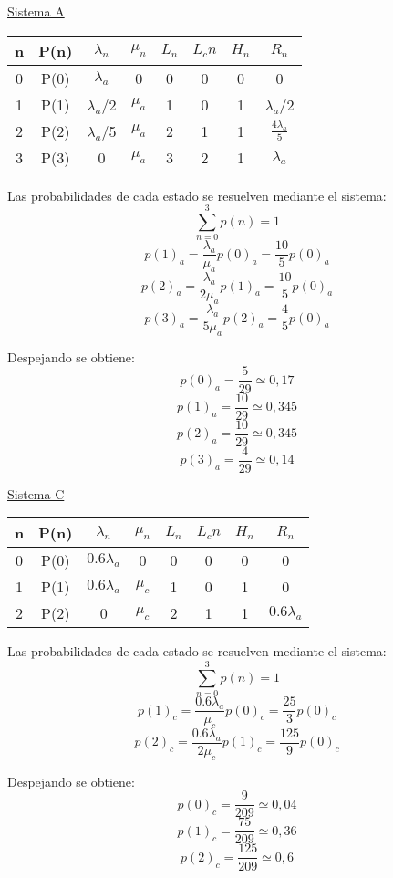 \documentclass{article}
\begin{document}
 \begin{center}
  \underline{Sistema A} \\ 
    \begin{tabular}{|| c | c | c | c | c | c | c | c ||}
    \hline 
     n & P(n) & $\lambda_n$ & $\mu_n$ & $L_n$& $L_cn$ & $H_n$ & $R_n$ 			\\ \hline \hline
     0 & P(0) & $\lambda_a$   & 0       & 0    & 0      & 0     & 0			\\ \hline
     1 & P(1) & $\lambda_a$/2 & $\mu_a$ & 1    & 0      & 1     & $\lambda_a$/2		\\ \hline
     2 & P(2) & $\lambda_a$/5 & $\mu_a$ & 2    & 1      & 1     & $\frac{4\lambda_a}{5}$	\\ \hline
     3 & P(3) &  0            & $\mu_a$ & 3    & 2      & 1     & $\lambda_a$ 		\\ \hline
     
    \end{tabular}
    
    Las probabilidades de cada estado se resuelven mediante el sistema: 
    $$ \sum_{n=0}^{3}p(n) = 1 $$
    $$ p(1)_a = \frac{\lambda_a}{\mu_a} p(0)_a = \frac{10}{5} p(0)_a $$
    $$ p(2)_a = \frac{\lambda_a}{2\mu_a} p(1)_a = \frac{10}{5} p(0)_a$$
    $$ p(3)_a = \frac{\lambda_a}{5\mu_a} p(2)_a = \frac{4}{5} p(0)_a$$
    
    Despejando se obtiene: 
    $$ p(0)_a = \frac{5}{29} \simeq 0,17 $$
    $$ p(1)_a = \frac{10}{29} \simeq 0,345 $$
    $$ p(2)_a = \frac{10}{29} \simeq 0,345 $$
    $$ p(3)_a = \frac{4}{29} \simeq 0,14 $$
    
  \end{center} 
  
 \begin{center}
  \underline{Sistema C} \\ 
    \begin{tabular}{|| c | c | c | c | c | c | c | c ||}
    \hline 
     n & P(n) & $\lambda_n$ & $\mu_n$ & $L_n$& $L_cn$ & $H_n$ & $R_n$ 			\\ \hline \hline
     0 & P(0) & $0.6 \lambda_a$ & 0       & 0    & 0      & 0     & 0			\\ \hline
     1 & P(1) & $0.6 \lambda_a$ & $\mu_c$ & 1    & 0      & 1     & 0	\\ \hline
     2 & P(2) & 0               & $\mu_c$ & 2    & 1      & 1     & $0.6 \lambda_a$ \\ \hline
     
    \end{tabular}
    
    Las probabilidades de cada estado se resuelven mediante el sistema: 
    $$ \sum_{n=0}^{3}p(n) = 1 $$
    $$ p(1)_c = \frac{0.6\lambda_a}{\mu_c} p(0)_c = \frac{25}{3}p(0)_c$$
    $$ p(2)_c = \frac{0.6\lambda_a}{2\mu_c} p(1)_c = \frac{125}{9} p(0)_c$$
    
    Despejando se obtiene: 
    $$ p(0)_c = \frac{9}{209} \simeq 0,04 $$
    $$ p(1)_c = \frac{75}{209} \simeq 0,36 $$
    $$ p(2)_c = \frac{125}{209} \simeq 0,6 $$
    
  \end{center}
  
\end{document}

